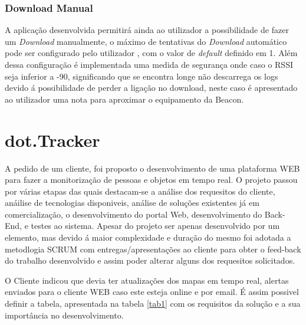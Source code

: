 \subsubsection{Download Manual}
\par A aplicação desenvolvida permitirá  ainda ao utilizador a possibilidade de fazer um \textit{Download} manualmente, o máximo de tentativas do \textit{Download} automático pode ser configurado pelo utilizador , com o valor de \textit{default} definido em 1. Além dessa configuração é implementada uma medida de segurança onde caso o RSSI seja inferior a -90, significando que se encontra longe não descarrega os logs devido á possibilidade de perder a ligação no download, neste caso é apresentado ao utilizador uma nota para aproximar o equipamento da Beacon. %

\section {dot.Tracker}
\par
A pedido de um cliente, foi proposto o desenvolvimento de uma plataforma WEB para fazer a monitorização de pessoas e objetos em tempo real. O projeto passou por várias  etapas das quais destacam-se a análise dos requesitos do cliente, anáilise de tecnologias disponiveis, análise de soluções existentes já em comercialização, o desenvolvimento do portal Web, desenvolvimento do Back-End, e testes ao sistema. Apesar do projeto ser apenas desenvolvido por um elemento, mas devido á maior complexidade e duração do mesmo foi adotada a metodlogia SCRUM com entregas/apresentações ao cliente para obter o feed-back do trabalho desenvolvido e assim poder alterar alguns dos requesitos solicitados.
\par O Cliente indicou que devia ter atualizações dos mapas em tempo real, alertas enviados para o cliente WEB caso este esteja online e por email.
É assim possivel definir a tabela, apresentada na tabela \ref{tab1} com os requisitos da solução e a sua importância no desenvolvimento.


